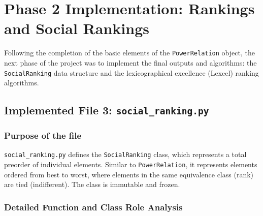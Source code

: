 \documentclass[11pt]{article}
\newcommand{\pathitem}[1]{\texttt{#1}}
\begin{document}
\section{Phase 2 Implementation: Rankings and Social Rankings}

Following the completion of the basic elements of the \pathitem{PowerRelation} object, the next phase of the project was to implement the final outputs and algorithms: the \pathitem{SocialRanking} data structure and the lexicographical excellence (Lexcel) ranking algorithms.

\subsection{Implemented File 3: \pathitem{social\_ranking.py}}

\subsubsection*{Purpose of the file}

\pathitem{social\_ranking.py} defines the \pathitem{SocialRanking} class, which represents a total preorder of individual elements. Similar to \pathitem{PowerRelation}, it represents elements ordered from best to worst, where elements in the same equivalence class (rank) are tied (indifferent). The class is immutable and frozen.

\subsubsection*{Detailed Function and Class Role Analysis}
\end{document}
